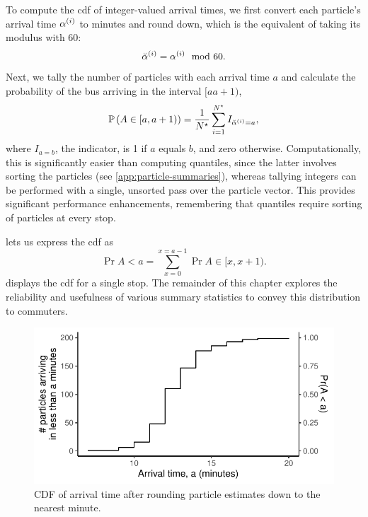 To compute the \gls{cdf} of integer-valued arrival times, we first convert each particle's arrival time $\alpha^{(i)}$ to minutes and round down, which is the equivalent of taking its modulus with 60:
\begin{equation}
\label{eq:particle_eta_modulus}
\breve{\alpha}^{(i)} = \alpha^{(i)} \mod 60.
\end{equation}
Next, we tally the number of particles with each arrival time $a$ and calculate the probability of the bus arriving in the interval $[a a+1)$,
\begin{equation}
\label{eq:pf_pdf_arrivaltime}
\mathbb{P}\left(A \in [a, a+1)\right) =
\frac{1}{N^\star} \sum_{i=1}^{N^\star} I_{\breve{\alpha}^{(i)} = a},
\end{equation}
where $I_{a=b}$, the indicator, is 1 if $a$ equals $b$, and zero otherwise. Computationally, this is significantly easier than computing quantiles, since the latter involves sorting the particles (see \cref{app:particle-summaries}), whereas tallying integers can be performed with a single, unsorted pass over the particle vector. This provides significant performance enhancements, remembering that quantiles require sorting of particles at every stop.


 lets us express the \gls{cdf} as
\begin{equation}
\label{eq:pf_cdf_arrivaltime}
\Pr{A < a} = \sum_{x=0}^{x=a-1} \Pr{A \in [x, x+1)}.
\end{equation}
 displays the \gls{cdf} for a single stop. The remainder of this chapter explores the reliability and usefulness of various summary statistics to convey this distribution to commuters.

\begin{knitrout}\small
{}\color{fgcolor}\begin{figure}

{\centering \includegraphics[width=.6\textwidth]{figure/eta_cdf-1} 

}

\caption[CDF of arrival time after rounding particle estimates down to the nearest minute]{CDF of arrival time after rounding particle estimates down to the nearest minute.}\label{fig:eta_cdf}
\end{figure}


\end{knitrout}





